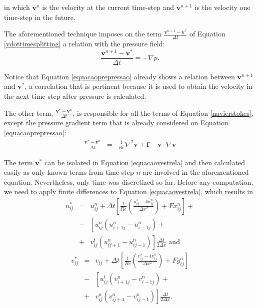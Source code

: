 \documentclass[journal]{IEEEtran}
\begin{document}
in which $\mathbf{v}^n$ is the velocity at the current time-step and $\mathbf{v}^{n+1}$ is the velocity one time-step in the future.

The aforementioned technique imposes on the term $\frac{\textbf{v}^{n+1}-\textbf{v}^*}{\Delta t}$ of Equation \ref{vdottimesplitting} a relation with the pressure field: 
\begin{equation}\frac{\textbf{v}^{n+1}-\textbf{v}^*}{\Delta t}=-\nabla p\label{equacaoprepressao}.\end{equation}

 Notice that Equation \ref{equacaoprepressao} already shows a relation between $\mathbf{v}^{n+1}$ and $\mathbf{v}^{*}$, a correlation that is pertinent because it is used to obtain the velocity in the next time step after pressure is calculated.


The other term, $\frac{\textbf{v}^{*}-\textbf{v}^n}{\Delta t}$, is responsible for all the terms of Equation \ref{navierstokes}, except the pressure gradient term that is already considered on Equation \ref{equacaoprepressao}: \begin{eqnarray}
\frac{\textbf{v}^{*}-\textbf{v}^n}{\Delta t}&=& \frac{1}{\mathit{Re}}\nabla ^2 \textbf{v} + \textbf{f} - \textbf{v}\cdot \nabla \textbf{v}\label{equacaovestrela}
\end{eqnarray}

The term $\mathbf{v}^*$ can be isolated in Equation \ref{equacaovestrela} and then calculated easily as only known terms from time step $n$ are involved in the aforementioned equation. Nevertheless, only time was discretized so far. Before any computation, we need to apply finite differences to Equation \ref{equacaovestrela}, which results in %
\begin{eqnarray}
u_{ij}^{*}&=&u_{ij}^n+\Delta t\left[\frac{1}{\mathit{Re}}\left(\frac{u_{ij}^s-4u_{ij}^n}{\Delta
x^2}\right)+Fx_{ij}^n\right] + \nonumber \\
&-&\left[u_{ij}^n(u_{i+1j}^n-u_{i-1j}^n)+ \right.\nonumber \\
&+& \left. v_{ij}^t(u_{ij+1}^n-u_{ij-1}^n)\right]\frac{\Delta t}{2\Delta x}\; \textrm{and }\label{step1-3}
\end{eqnarray}
\begin{eqnarray}
v_{ij}^{*}&=&v_{ij}+\Delta t\left[\frac{1}{\mathit{Re}}\left(\frac{v_{ij}^s-4v_{ij}^n}{\Delta
x^2}\right)+Fy_{ij}^n\right] \nonumber \\
&-&\left[u_{ij}^t (v_{i+1j}^n-v_{i-1j}^n)+ \right.\nonumber \\
&+& \left. v_{ij}^n(v_{ij+1}^n-v_{ij-1}^n)\right]\frac{\Delta t}{2\Delta x}.\label{step1-4}
\end{eqnarray}
\end{document}
